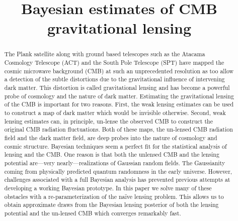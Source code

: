 \documentclass[noinfoline]{imsart}
\begin{document}
\begin{frontmatter}
\title{Bayesian estimates of CMB gravitational lensing}

\begin{abstract} 
The Plank satellite along with
ground based telescopes such as the Atacama Cosmology Telescope (ACT)  and  the South Pole Telescope (SPT) have mapped the  cosmic microwave background (CMB) at such an unprecedented resolution as too allow a detection of the subtle distortions  due to the gravitational influence of intervening  dark matter. This distortion is called  gravitational lensing and has become a  powerful probe of cosmology and the nature of dark matter.
Estimating the gravitational lensing of the CMB  is important for two reasons. First, the weak lensing estimates can be used to construct a map of dark matter which would be invisible otherwise.
Second,  weak lensing estimates can, in principle, un-lense the observed CMB to construct the original CMB radiation fluctuations. Both of these maps,  the un-lensed CMB radiation field and the dark matter field, are deep probes into the nature of cosmology and cosmic structure. Bayesian techniques seem a perfect fit for the statistical analysis of lensing and the CMB. One reason is that both the unlensed CMB and the lensing potential are---very nearly---realizations of Gaussian random fields. The Gaussianity coming from physically predicted   quantum randomness in the early universe. However, challenges associated with a full Bayesian analysis has prevented previous attempts at  developing a working Bayesian prototype. 
In this paper we solve many of these obstacles with a re-parameterization of the na\"ive lensing problem. This  allows us to obtain approximate draws from the  Bayesian lensing posterior of both the lensing potential and the un-lensed CMB which converges remarkably fast. 
\end{abstract}

\begin{keyword}
\end{keyword}

\end{frontmatter}
\end{document}
